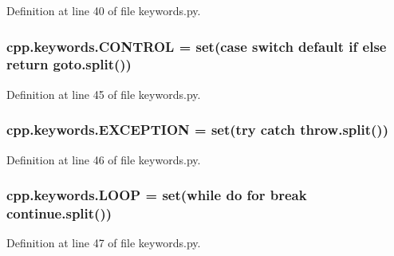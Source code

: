 Definition at line 40 of file keywords.\+py.

\subsubsection[{\texorpdfstring{C\+O\+N\+T\+R\+OL}{CONTROL}}]{\setlength{\rightskip}{0pt plus 5cm}cpp.\+keywords.\+C\+O\+N\+T\+R\+OL = set(\textquotesingle{}case switch default {\bf if} else return goto\textquotesingle{}.split())}\hypertarget{namespacecpp_1_1keywords_a374dfe9c96681079802ba4724287b8ff}{}\label{namespacecpp_1_1keywords_a374dfe9c96681079802ba4724287b8ff}


Definition at line 45 of file keywords.\+py.

\subsubsection[{\texorpdfstring{E\+X\+C\+E\+P\+T\+I\+ON}{EXCEPTION}}]{\setlength{\rightskip}{0pt plus 5cm}cpp.\+keywords.\+E\+X\+C\+E\+P\+T\+I\+ON = set(\textquotesingle{}try catch throw\textquotesingle{}.split())}\hypertarget{namespacecpp_1_1keywords_a2665fb8a25a4dae03fa5d3dc975c537c}{}\label{namespacecpp_1_1keywords_a2665fb8a25a4dae03fa5d3dc975c537c}


Definition at line 46 of file keywords.\+py.

\subsubsection[{\texorpdfstring{L\+O\+OP}{LOOP}}]{\setlength{\rightskip}{0pt plus 5cm}cpp.\+keywords.\+L\+O\+OP = set(\textquotesingle{}while do for break continue\textquotesingle{}.split())}\hypertarget{namespacecpp_1_1keywords_af0164c05398a2291487b76414102d555}{}\label{namespacecpp_1_1keywords_af0164c05398a2291487b76414102d555}


Definition at line 47 of file keywords.\+py.

